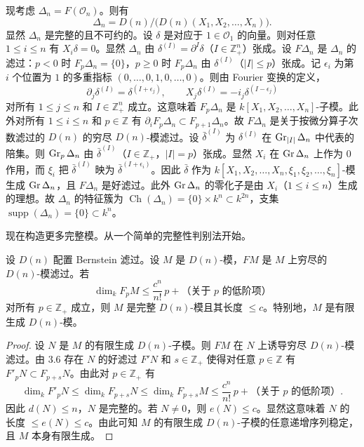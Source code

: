 \begin{example}
现考虑 $\Delta_n=F(\mathcal{O}_n)$。则有
$$\Delta_n=D(n)/\bigl(D(n)(X_1,X_2,\dots,X_n)\bigr).$$
显然 $\Delta_n$ 是完整的且不可约的。设 $\delta$ 是对应于 $1\in\mathcal{O}_1$ 的向量。则对任意 $1\le i\le n$ 有 $X_i\delta=0$。显然 $\Delta_n$ 由 $\delta^{(I)}=\partial^I\delta$（$I\in\mathbb{Z}_+^n$）张成。设 $F\Delta_n$ 是 $\Delta_n$ 的滤过：$p<0$ 时 $F_p\Delta_n=\{0\}$，$p\ge 0$ 时 $F_p\Delta_n$ 由 $\delta^{(I)}$（$|I|\le p$）张成。记 $\epsilon_i$ 为第 $i$ 个位置为 $1$ 的多重指标 $(0,\dots,0,1,0,\dots,0)$。则由 Fourier 变换的定义，
$$\partial_j\delta^{(I)}=\delta^{(I+\epsilon_j)},\qquad X_j\delta^{(I)}=-i_j\delta^{(I-\epsilon_j)}$$
对所有 $1\le j\le n$ 和 $I\in\mathbb{Z}_+^n$ 成立。这意味着 $F_p\Delta_n$ 是 $k[X_1,X_2,\dots,X_n]$-子模。此外对所有 $1\le i\le n$ 和 $p\in\mathbb{Z}$ 有 $\partial_i F_p\Delta_n\subset F_{p+1}\Delta_n$。故 $F\Delta_n$ 是关于按微分算子次数滤过的 $D(n)$ 的穷尽 $D(n)$-模滤过。设 $\bar\delta^{(I)}$ 为 $\delta^{(I)}$ 在 $\operatorname{Gr}_{|I|}\Delta_n$ 中代表的陪集。则 $\operatorname{Gr}_p\Delta_n$ 由 $\bar\delta^{(I)}$（$I\in\mathbb{Z}_+$，$|I|=p$）张成。显然 $X_i$ 在 $\operatorname{Gr}\Delta_n$ 上作为 $0$ 作用，而 $\xi_i$ 把 $\bar\delta^{(I)}$ 映为 $\bar\delta^{(I+\epsilon_i)}$。因此 $\bar\delta$ 作为 $k[X_1,X_2,\dots,X_n,\xi_1,\xi_2,\dots,\xi_n]$-模生成 $\operatorname{Gr}\Delta_n$，且 $F\Delta_n$ 是好滤过。此外 $\operatorname{Gr}\Delta_n$ 的零化子是由 $X_i$（$1\le i\le n$）生成的理想。故 $\Delta_n$ 的特征簇为 $\operatorname{Ch}(\Delta_n)=\{0\}\times k^n\subset k^{2n}$，支集 $\operatorname{supp}(\Delta_n)=\{0\}\subset k^n$。
\end{example}

现在构造更多完整模。从一个简单的完整性判别法开始。

\begin{lemma}
设 $D(n)$ 配置 Bernstein 滤过。设 $M$ 是 $D(n)$-模，$F M$ 是 $M$ 上穷尽的 $D(n)$-模滤过。若
$$\dim_k F_p M\le\frac{c^n}{n!}\,p+\text{（关于 $p$ 的低阶项）}$$
对所有 $p\in\mathbb{Z}_+$ 成立，则 $M$ 是完整 $D(n)$-模且其长度 $\le c$。特别地，$M$ 是有限生成 $D(n)$-模。
\end{lemma}

\begin{proof}
设 $N$ 是 $M$ 的有限生成 $D(n)$-子模。则 $F M$ 在 $N$ 上诱导穷尽 $D(n)$-模滤过。由 3.6 存在 $N$ 的好滤过 $F'N$ 和 $s\in\mathbb{Z}_+$ 使得对任意 $p\in\mathbb{Z}$ 有 $F'_p N\subset F_{p+s}N$。由此对 $p\in\mathbb{Z}_+$ 有
$$\dim_k F'_p N\le\dim_k F_{p+s}N\le\dim_k F_{p+s}M\le\frac{c^n}{n!}\,p+\text{（关于 $p$ 的低阶项）}.$$
因此 $d(N)\le n$，$N$ 是完整的。若 $N\neq 0$，则 $e(N)\le c$。显然这意味着 $N$ 的长度 $\le e(N)\le c$。由此可知 $M$ 的有限生成 $D(n)$-子模的任意递增序列稳定，且 $M$ 本身有限生成。
\end{proof}

